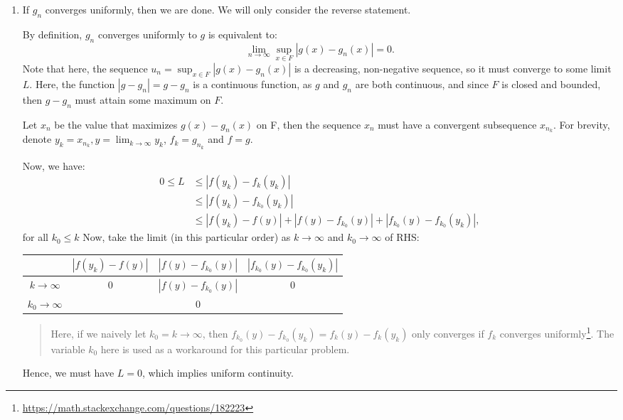 \begin{enumerate}[label=\textbf{2E.\arabic*}]
\item If \( g_{n} \) converges uniformly, then we are done. We will only
  consider the reverse statement.
  
  By definition, \( g_{n} \) converges uniformly to \( g \) is equivalent to:
  \[
    \lim_{n \to \infty} \sup_{x \in F} |g(x)-g_{n}(x)| = 0
  .\] 
  Note that here, the sequence \( u_{n} = \sup_{x \in F} |g(x)-g_{n}(x)| \) is
  a decreasing, non-negative sequence, so it must converge to some limit \( L
  \). Here, the function \( |g - g_{n}| = g - g_{n} \) is a continuous function,
  as \( g \) and \( g_{n} \) are both continuous, and since \( F \) is closed
  and bounded, then \( g-g_{n} \) must attain some maximum on \( F \).
  
  Let \( x_{n} \) be
  the value that maximizes \( g(x)-g_{n}(x) \) on F, then the sequence \( x_{n}
  \) must have a convergent subsequence \( x_{n_{k}} \).
  For brevity, denote \( y_{k} = x_{n_{k}}, y = \lim_{k \to \infty} y_{k} \),
  \( f_{k} = g_{n_{k}} \) and \( f = g \).

  Now, we have:
  \begin{align*}
    0\le L &\le |f(y_{k}) - f_{k}(y_{k})|\\
    &\le |f(y_{k}) - f_{k_{0}}(y_{k})|\\
    &\le |f(y_{k})-f(y)| + |f(y)-f_{k_{0}}(y)| +
    |f_{k_{0}}(y)-f_{k_{0}}(y_{k})|
  ,\end{align*} for all \( k_{0} \le k \)
  Now, take the limit (in this particular order) as \( k \to \infty \) and \(
  k_{0} \to \infty \) of RHS:
  \begin{center}
    \begin{tabular}{c|c|c|c}
      & \( |f(y_{k})-f(y)| \) & \( |f(y)-f_{k_{0}}(y)| \) & \(
      |f_{k_{0}}(y)-f_{k_{0}}(y_{k})| \)\\
      \hline
      \( k \to \infty \) & 0 & \( |f(y)-f_{k_{0}}(y)| \) & 0\\
      \hline
      \( k_{0} \to \infty \) &  & 0 & 
    \end{tabular}
  \end{center}
  \begin{quote}
  Here, if we naively let \( k_{0} = k \to \infty \), then \(
  f_{k_{0}}(y)-f_{k_{0}}(y_{k}) = f_{k}(y)-f_{k}(y_{k}) \) only converges if \(
  f_{k}\) converges
  uniformly\footnote{\href{https://math.stackexchange.com/questions/182223}{https://math.stackexchange.com/questions/182223}}.
  The variable \( k_{0} \) here is used as a workaround for this particular
  problem.
\end{quote}
  Hence, we must have \( L = 0 \), which implies uniform continuity.


\end{enumerate}
